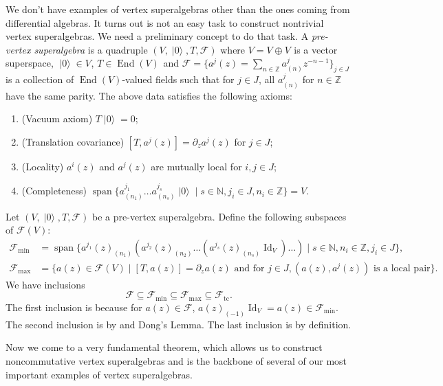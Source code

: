 \documentclass[a4paper, 12pt, reqno]{amsart}
\theoremstyle{remark}
\numberwithin{equation}{subsection}
\DeclareMathOperator{\Id}{Id}
\DeclareMathOperator{\End}{End}
\DeclareMathOperator{\vspan}{span}
\DeclareMathOperator{\vac}{|0\rangle}
\DeclareMathOperator{\zero}{\overline{0}}
\DeclareMathOperator{\one}{\overline{1}}
\DeclareMathOperator{\tc}{tc}
\begin{document}
We don't have examples of vertex superalgebras other than the ones coming from differential algebras.
It turns out is not an easy task to construct nontrivial vertex superalgebras.
We need a preliminary concept to do that task.
A \emph{pre-vertex superalgebra} is a quadruple $(V, \vac, T, \mathcal{F})$ where $V = V_{\zero} \oplus V_{\one}$ is a vector superspace, $\vac \in V_{\zero}$, $T \in \End(V)_{\zero}$ and $\mathcal{F} = \{a^j(z) = \sum_{n \in \mathbb{Z}}a^j_{(n)}z^{-n - 1}\}_{j \in J}$ is a collection of $\End(V)$-valued fields such that for $j \in J$, all $a^j_{(n)}$ for $n \in \mathbb{Z}$ have the same parity.
The above data satisfies the following axioms:
\begin{enumerate}
\item (Vacuum axiom) $T\vac = 0$;
\item (Translation covariance) $[T, a^j(z)] = \partial_za^j(z)$ for $j \in J$;
\item (Locality) $a^i(z)$ and $a^j(z)$ are mutually local for $i, j \in J$;
\item (Completeness) $\vspan\{a^{j_1}_{(n_1)}\dots a^{j_s}_{(n_s)}\vac \mid s \in \mathbb{N}, j_i \in J, n_i \in \mathbb{Z}\} = V$.
\end{enumerate}

Let $(V, \vac, T, \mathcal{F})$ be a pre-vertex superalgebra.
Define the following subspaces of $\mathcal{F}(V)$:
\begin{align*}
  \mathcal{F}_{\min} &= \vspan\{a^{j_1}(z)_{(n_1)}(a^{j_2}(z)_{(n_2)}\dots(a^{j_s}(z)_{(n_s)}\Id_V)\dots) \mid s \in \mathbb{N}, n_i \in \mathbb{Z}, j_i \in J\}, \\
  \mathcal{F}_{\max} &= \{a(z) \in \mathcal{F}(V) \mid [T, a(z)] = \partial_za(z)\text{ and for }j \in J, (a(z),a^j(z))\text{ is a local pair}\}.
\end{align*}
We have inclusions
\begin{equation*}
  \mathcal{F} \subseteq \mathcal{F}_{\min} \subseteq \mathcal{F}_{\max} \subseteq \mathcal{F}_{\tc}.
\end{equation*}
The first inclusion is because for $a(z) \in \mathcal{F}$, $a(z)_{(-1)}\Id_V = a(z) \in \mathcal{F}_{\min}$.
The second inclusion is by  and Dong's Lemma.
The last inclusion is by definition.

Now we come to a very fundamental theorem, which allows us to construct noncommutative vertex superalgebras and is the backbone of several of our most important examples of vertex superalgebras.
\end{document}
